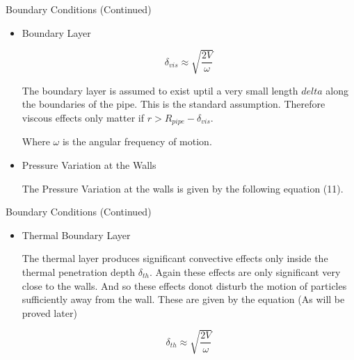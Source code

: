 \documentclass{beamer}
\begin{document}
\begin{frame}{Boundary Conditions (Continued)}


\begin{itemize}
\item Boundary Layer

\begin{equation}
\delta_{vis} \approx \sqrt{\frac{2V}{\omega}}
\end{equation}



The boundary layer is assumed to exist uptil a very small length $delta$ along the boundaries of the pipe. This is the standard assumption. Therefore viscous effects only matter if $r > R_{pipe} - \delta_{vis}$.



Where $\omega$ is the angular frequency of motion.

\item Pressure Variation at the Walls

The Pressure Variation at the walls is given by the following equation (11).

\end{itemize}

\end{frame}


\begin{frame}{Boundary Conditions (Continued)}


\begin{itemize}
\item Thermal Boundary Layer

The thermal layer produces significant convective effects only inside the thermal penetration depth $\delta_{th}$. Again these effects are only significant very close to the walls. And so these effects donot disturb the motion of particles sufficiently away from the wall. These are given by the equation (As will be proved later)

\begin{equation}
\delta_{th} \approx \sqrt{\frac{2V}{\omega}}
\end{equation}
\end{itemize}
\end{frame}
\end{document}
